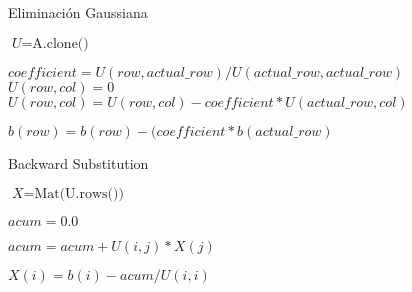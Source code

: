 \documentclass[a4paper]{article}
\begin{document}
\begin{algorithm}
\caption{Eliminación Gaussiana}\label{euclid}
\begin{algorithmic}[1]


    \State $\textit{U} = \text{A.clone()}$

        \Return
      \EndIf

          \State $coefficient = U(row, actual\_row) / U(actual\_row, actual\_row)$
              \State $U(row,col) = 0$
            \Else
              \State $U(row, col) = U(row, col) - coefficient * U(actual\_row, col)$
            \EndIf
          \EndFor

          \State $b(row) = b(row) - (coefficient * b(actual\_row)$
      \EndFor    
    \EndFor

  \EndFunction

\end{algorithmic}
\end{algorithm}




\begin{algorithm}
\caption{Backward Substitution}\label{euclid}
\begin{algorithmic}[1]


    \State $\textit{X} = \text{Mat(U.rows())}$

      \State $acum = 0.0$

        \State $acum = acum + U(i, j) * X(j)$
      \EndFor

      \State $X(i) = b(i) - acum / U(i, i)$

    \EndFor
      
  \EndFunction

\end{algorithmic}
\end{algorithm}
\end{document}
